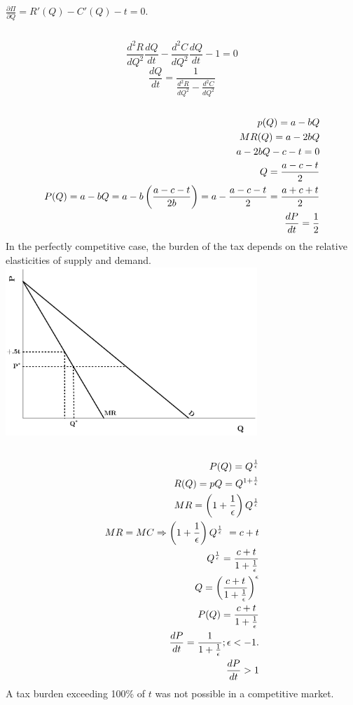 \documentclass{article}
\begin{document}
	\subsection[a]{}
		$\frac{\partial \Pi}{\partial Q} = R'(Q)-C'(Q) -t =0.$
	\subsection[b]{}
		$$\frac{d^2R}{dQ^2}\frac{dQ}{dt}-\frac{d^2C}{dQ^2}\frac{dQ}{dt}-1=0$$
		$$\frac{dQ}{dt} = \frac{1}{\frac{d^2R}{dQ^2}-\frac{d^2C}{dQ^2}}$$
	\subsection[c]{}
		\begin{align}
			\setcounter{equation}{0}
			p(Q) = a-bQ \\
			MR(Q) = a-2bQ \\
			a-2bQ-c-t=0\\
			Q = \frac{a-c-t}{2}\\
			P(Q) = a-bQ = a-b\left ( \frac{a-c-t}{2b} \right ) = a - \frac{a-c-t}{2} = \frac{a+c+t}{2} \\
			\frac{dP}{dt} = \frac{1}{2}
		\end{align}				
		In the perfectly competitive case, the burden of the tax depends on the relative elasticities of supply and demand.\\
		\includegraphics[height=2.5in]{Charts/7c}
	\subsection[d]{}
		\begin{align}
		\setcounter{equation}{0}
			P(Q) = Q^{\frac{1}{\epsilon}} \\
			R(Q) = pQ = Q^{1+\frac{1}{\epsilon}} \\
			MR = \left ( 1+ \frac{1}{\epsilon} \right ) Q^{\frac{1}{\epsilon}}\\
			MR = MC \Rightarrow  \left ( 1+ \frac{1}{\epsilon} \right ) Q^{\frac{1}{\epsilon}}\ = c+t \\
			Q^{\frac{1}{\epsilon}} = \frac{c+t}{1+\frac{1}{\epsilon}} \\
			Q = \left (  \frac{c+t}{1+\frac{1}{\epsilon}}  \right ) ^ \epsilon \\
			P(Q) = \frac{c+t}{1+\frac{1}{\epsilon}} \\
			\frac{dP}{dt} = \frac{1}{1+\frac{1}{\epsilon}}; \epsilon < -1. \\
			\frac{dP}{dt} > 1
		\end{align}
		A tax burden exceeding 100\% of $t$ was not possible in a competitive market.
\end{document}
